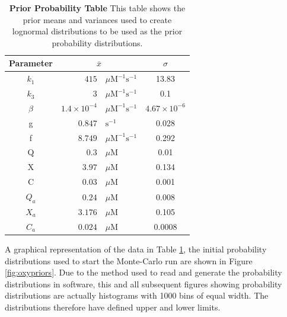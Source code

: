 \begin{table}[ht]%
\renewcommand{\arraystretch}{1.5}
\begin{center}
\begin{tabular}{crlc}
\toprule
\textbf{Parameter} & \multicolumn{2}{c}{${\bar{x}}$} & $\sigma$\\
\midrule
$k_1$ & $415$ & $\mu \mathrm{M}^{-1} \mathrm{s}^{-1}$ & 13.83\\
$k_3$ & $3$ & $\mu \mathrm{M}^{-1} \mathrm{s}^{-1}$ & 0.1\\
$\beta$ & $1.4\times 10^{-4}$ & $\mu \mathrm{M}^{-1} \mathrm{s}^{-1}$ & $4.67\times 10^{-6}$\\
g & $0.847$ & $\mathrm{s}^{-1}$ & 0.028\\
f & $8.749$ & $\mu \mathrm{M}^{-1}\mathrm{s}^{-1}$ & 0.292\\
Q & $0.3$ & $\mu \mathrm{M}$ & 0.01\\
X & $3.97$ & $\mu \mathrm{M}$ & 0.134\\
C & $0.03$ & $\mu \mathrm{M}$ & 0.001\\
$Q_a$ & $0.24$ & $\mu \mathrm{M}$ & 0.008\\
$X_a$ & $3.176$ & $\mu \mathrm{M}$ & 0.105\\
$C_a$ & $0.024$ & $\mu \mathrm{M}$ & 0.0008\\
\bottomrule
\end{tabular}
\end{center}
\caption[First Prior Probability Table]{{\bf Prior Probability Table} This table shows the prior means and variances used to create lognormal distributions to be used as the prior probability distributions.
\label{tab:oxyProbstat}}
\end{table}

\noindent A graphical representation of the data in Table \ref{tab:oxyProbstat}, the initial probability distributions used to start the Monte-Carlo run are shown in Figure \ref{fig:oxypriors}. Due to the method used to read and generate the probability distributions in software, this and all subsequent figures showing probability distributions are actually histograms with 1000 bins of equal width. The distributions therefore have defined upper and lower limits.%

